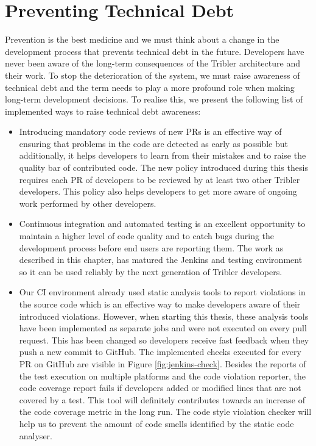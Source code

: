 \section{Preventing Technical Debt}
Prevention is the best medicine and we must think about a change in the development process that prevents technical debt in the future. Developers have never been aware of the long-term consequences of the Tribler architecture and their work. To stop the deterioration of the system, we must raise awareness of technical debt and the term needs to play a more profound role when making long-term development decisions. To realise this, we present the following list of implemented ways to raise technical debt awareness:
\begin{itemize}
	\item Introducing mandatory code reviews of new PRs is an effective way of ensuring that problems in the code are detected as early as possible\cite{18fpreventdebt} but additionally, it helps developers to learn from their mistakes and to raise the quality bar of contributed code. The new policy introduced during this thesis requires each PR of developers to be reviewed by at least two other Tribler developers. This policy also helps developers to get more aware of ongoing work performed by other developers.
	\item Continuous integration and automated testing is an excellent opportunity to maintain a higher level of code quality and to catch bugs during the development process before end users are reporting them. The work as described in this chapter, has matured the Jenkins and testing environment so it can be used reliably by the next generation of Tribler developers.
	\item Our CI environment already used static analysis tools to report violations in the source code which is an effective way to make developers aware of their introduced violations\cite{nagappan2005static}. However, when starting this thesis, these analysis tools have been implemented as separate jobs and were not executed on every pull request. This has been changed so developers receive fast feedback when they push a new commit to GitHub. The implemented checks executed for every PR on GitHub are visible in Figure \ref{fig:jenkins-check}. Besides the reports of the test execution on multiple platforms and the code violation reporter, the code coverage report fails if developers added or modified lines that are not covered by a test. This tool will definitely contributes towards an increase of the code coverage metric in the long run. The code style violation checker will help us to prevent the amount of code smells identified by the static code analyser.
\end{itemize}

